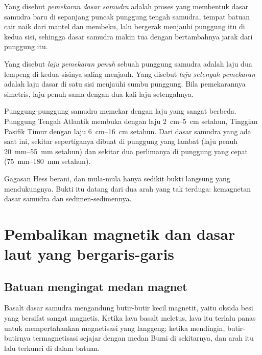 \begin{definition}\label{def:g11:drift-to-spreading:spreading}
Yang disebut \emph{pemekaran dasar samudra}
adalah proses yang membentuk dasar samudra baru di sepanjang puncak punggung
tengah samudra, tempat batuan cair naik dari mantel dan membeku, lalu bergerak
menjauhi punggung itu di kedua sisi, sehingga dasar samudra makin tua dengan
bertambahnya jarak dari punggung itu.
\end{definition}

\begin{definition}\label{def:g11:drift-to-spreading:spreading-rate}
Yang disebut \emph{laju pemekaran penuh} sebuah punggung
samudra adalah laju dua lempeng di kedua sisinya saling menjauh. Yang disebut
\emph{laju setengah pemekaran} adalah laju dasar di satu sisi menjauhi sumbu
punggung. Bila pemekarannya simetris, laju penuh sama dengan dua kali laju
setengahnya.
\end{definition}

Punggung-punggung samudra memekar dengan laju yang sangat berbeda. Punggung
Tengah Atlantik membuka dengan laju \qtyrange{2}{5}{cm} setahun, Tinggian
Pasifik Timur dengan laju \qtyrange{6}{16}{cm} setahun. Dari dasar samudra yang
ada saat ini, sekitar sepertiganya dibuat di punggung yang lambat (laju penuh
\qtyrange{20}{55}{mm} setahun) dan sekitar dua perlimanya di punggung yang
cepat (\qtyrange{75}{180}{mm} setahun).

Gagasan Hess berani, dan mula-mula hanya sedikit bukti langsung yang
mendukungnya. Bukti itu datang dari dua arah yang tak terduga: kemagnetan dasar
samudra dan sedimen-sedimennya.

\section{Pembalikan magnetik dan dasar laut yang bergaris-garis}

\subsection{Batuan mengingat medan magnet}

Basalt dasar samudra mengandung butir-butir kecil magnetit, yaitu oksida besi
yang bersifat sangat magnetis. Ketika lava basalt meletus, lava itu terlalu
panas untuk mempertahankan magnetisasi yang langgeng; ketika mendingin,
butir-butirnya termagnetisasi sejajar dengan medan Bumi di sekitarnya, dan arah
itu lalu terkunci di dalam batuan.

